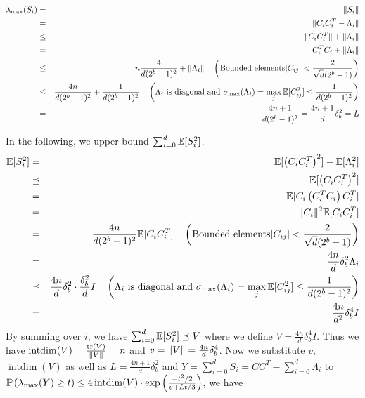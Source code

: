 \documentclass[12pt]{article}
\begin{document}
	
\begin{eqnarray*}
	\lambda_{\max}(S_i) &=& \|S_i \| \\
			&=& \| C_iC^T_i - \Lambda_i \|	\\
			& \leq & \| C_iC^T_i \| + \| \Lambda_i \| \\
			&=& C_i^TC_i + \| \Lambda_i \| \\
			&\leq& n \frac{4}{d(2^b - 1)^2} + \| \Lambda_i\| \quad \left(\text{Bounded elements} |C_{ij}| < \frac{2}{\sqrt{d}(2^b - 1)}\right)\\
			&\leq& \frac{4n}{d(2^b - 1)^2} + \frac{1}{d(2^b - 1)^2} \quad \left( \Lambda_i \text{ is diagonal and } \sigma_{\max}(\Lambda_i) = \max_j \E [C^2_{ij}] \leq \frac{1}{d(2^b - 1)^2} \right) \\
			&=& \frac{4n + 1}{d(2^b - 1)^2} = \frac{4n + 1}{d}\delta^2_b = L
\end{eqnarray*}

In the following, we upper bound $\sum\nolimits_{i=0}^d \E [S_i^2]$.
\begin{eqnarray*}
			\E [S^2_i] &=& \E [\left(C_iC^T_i\right)^2 ] - \E [\Lambda^2_i ]	\\
			& \preceq & \E [\left(C_iC^T_i\right)^2 ] \\
			&=& \E [C_i\left(C^T_i C_i\right)C^T_i ] \\
			&=& \|C_i\|^2 \E [C_iC^T_i ] \\
			&=& \frac{4n}{d(2^b - 1)^2} \E [C_iC^T_i ]  \quad \left(\text{Bounded elements} |C_{ij}| < \frac{2}{\sqrt{d}(2^b - 1)}\right)\\
			&=& \frac{4n}{d}\delta^2_b \Lambda_i \\
			&\preceq& \frac{4n}{d}\delta^2_b\cdot \frac{\delta^2_b}{d} I \quad \left( \Lambda_i \text{ is diagonal and } \sigma_{\max}(\Lambda_i) = \max_j \E [C^2_{ij}] \leq \frac{1}{d(2^b - 1)^2} \right) \\
			&=& \frac{4n}{d^2}\delta^4_b I
%
\end{eqnarray*}
By summing over $i$, we have $\sum^d_{i=0} \E [S^2_i] \preceq V$ where we define $V = \frac{4n}{d}\delta^4_b I$. Thus we have $\operatorname{intdim}(V) = \frac{\tr(V)}{\norm{V}}=n$ and $v=\norm{V}=\frac{4n}{d}\delta^4_b$. Now we substitute  $v$, $\operatorname{intdim}(V)$ as well as $L=\frac{4n + 1}{d}\delta^2_b$ and $Y=\sum^d_{i=0}S_i = CC^T - \sum^d_{i=0} \Lambda_i$ to $\Prob \left( \lambda_{\max}(Y) \geq t \right)
	\leq 4 \operatorname{intdim}(V) \cdot \exp\left( \frac{-t^2/2}{v + Lt/3} \right)$, we have
	
\end{document}
